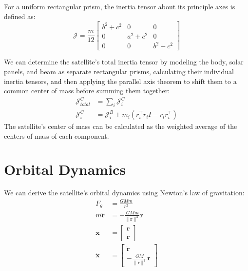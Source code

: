 \documentclass[11pt]{article}
\begin{document}
For a uniform rectangular prism, the inertia tensor about its principle axes is defined as:
\begin{equation*}
  \mathcal{J} = \frac{m}{12}\begin{bmatrix}
    b^2+c^2 & 0 & 0 \\
    0 & a^2+c^2 & 0 \\
    0 & 0 & b^2 + c^2
  \end{bmatrix}
\end{equation*}

We can determine the satellite's total inertia tensor by modeling the body, solar panels, and beam as separate rectangular prisms, calculating their individual inertia tensors, and then applying the parallel axis theorem to shift them to a common center of mass before summing them together:
\begin{align*}
  \mathcal{J}_{total}^C &= \sum_i \mathcal{J}_i^C \\
  \mathcal{J}_i^C &= \mathcal{J}_i^B + m_i \left( r_i^\top r_i I - r_i r_i^\top \right)
\end{align*}
The satellite's center of mass can be calculated as the weighted average of the centers of mass of each component.

\section{Orbital Dynamics}
We can derive the satellite's orbital dynamics using Newton's law of gravitation:
\begin{align*}
  F_g &= \frac{GMm}{r^2} \\
  m\ddot{\mathbf{r}} &= -\frac{GMm}{\|\mathbf{r}\|^3} \mathbf{r} \\
  \mathbf{x} &= \begin{bmatrix} \mathbf{r} \\ \dot{\mathbf{r}} \end{bmatrix} \\
  \dot{\mathbf{x}} &= \begin{bmatrix} \dot{\mathbf{r}} \\ -\frac{GM}{\|\mathbf{r}\|^3} \mathbf{r} \end{bmatrix}
\end{align*}
\end{document}
